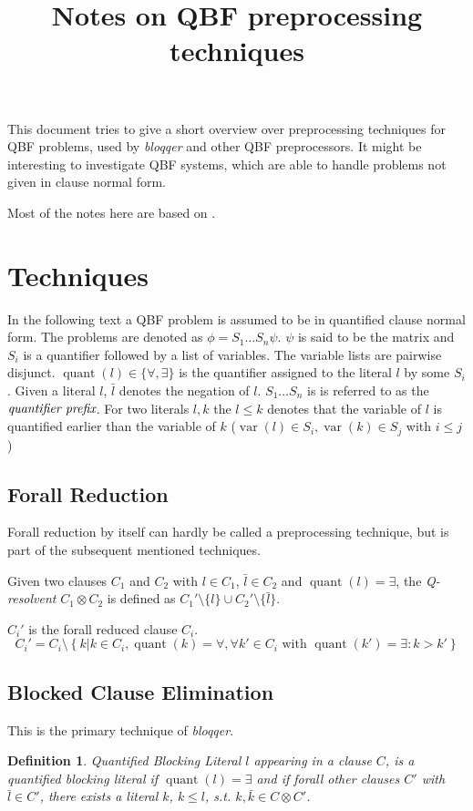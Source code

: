 \documentclass{scrartcl}
\title{Notes on QBF preprocessing techniques}
\DeclareMathOperator{\quant}{quant}
\DeclareMathOperator{\var}{var}
\newtheorem{definition}{Definition}
\begin{document}
\maketitle

This document tries to give a short overview over preprocessing techniques for
QBF problems, used by \emph{bloqqer} and other QBF preprocessors. It might be
interesting to investigate QBF systems, which are able to handle problems not
given in clause normal form.

Most of the notes here are based on \cite{biere11}.

\section{Techniques}
In the following text a QBF problem is assumed to be in quantified clause normal
form. The problems are denoted as $\phi = S_1\dots S_n\psi$. $\psi$ is said to
be the matrix and $S_i$ is a quantifier followed by a list of variables. The
variable lists are pairwise disjunct.
$\quant(l)\in\{\forall,\exists\}$ is the quantifier assigned to the literal
$l$ by some $S_i$. Given a literal $l$, $\bar{l}$ denotes the negation of $l$.
$S_1\dots S_n$ is is referred to as the $\emph{quantifier prefix}$.
For two literals $l,k$ the $l\leq k$ denotes that the variable of $l$ is
quantified earlier than the variable of $k$ ($\var(l)\in S_i, \var(k)\in S_j$
with $i\leq j$)

\subsection{Forall Reduction}
Forall reduction by itself can hardly be called a preprocessing technique, but
is part of the subsequent mentioned techniques. 

Given two clauses $C_1$ and $C_2$ with $l\in C_1$, $\bar{l}\in C_2$ and
$\quant(l)=\exists$, the \emph{Q-resolvent} $C_1\otimes C_2$ is defined
as $C_1'\setminus\{l\}\cup C_2'\setminus\{\bar{l}\}$.

$C_i'$ is the forall reduced clause $C_i$.
\begin{equation*}
C_i'=C_i\setminus\left\{k | k\in C_i,\quant(k)=\forall,\forall k'\in C_i\text{ with }
\quant(k')=\exists : k>k'\right\}
\end{equation*}

\subsection{Blocked Clause Elimination}
This is the primary technique of \emph{bloqqer}. 
\begin{definition}{Quantified Blocking Literal}
$l$ appearing in a clause $C$, is a \emph{quantified blocking literal} if
$\quant(l)=\exists$ and if forall other clauses $C'$ with $\bar{l}\in C'$,
there exists a literal $k$, $k\leq l$, s.t.  $k,\bar{k}\in C\otimes C'$.
\end{definition}
\end{document}
